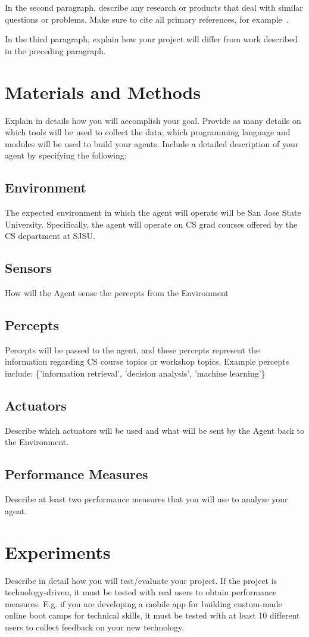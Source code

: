 \documentclass{article}
\begin{document}
In the second paragraph, describe any research or products that deal with similar questions or problems.  Make sure to cite all primary references, for example~\cite{einstein}.

In the third paragraph, explain how your project will differ from work described in the preceding paragraph. 

\section{Materials and Methods}
Explain in details how you will accomplish your goal.  Provide as many details on which tools will be used to collect the data; which programming language and modules will be used to build your agents.
Include a detailed description of your agent by specifying the following:
\subsection{Environment}
The expected environment in which the agent will operate will be San Jose State University. Specifically, the agent will operate on CS grad courses offered by the CS department at SJSU. 
\subsection{Sensors}
How will the Agent sense the percepts from the Environment
\subsection{Percepts}
Percepts will be passed to the agent, and these percepts represent the information regarding CS course topics or workshop topics. Example percepts include: 
\{'information retrieval', 'decision analysis', 'machine learning'\}
\subsection{Actuators}
Describe which actuators will be used and what will be sent by the Agent back to the Environment.
\subsection{Performance Measures}
Describe at least two performance measures that you will use to analyze your agent.

\section{Experiments}
Describe in detail how you will test/evaluate your project.
If the project is technology-driven, it must be tested with real users to obtain performance measures.  E.g. if you are developing a mobile app for building custom-made online boot camps for technical skills, it must be tested with at least 10 different users to collect feedback on your new technology.
\end{document}
